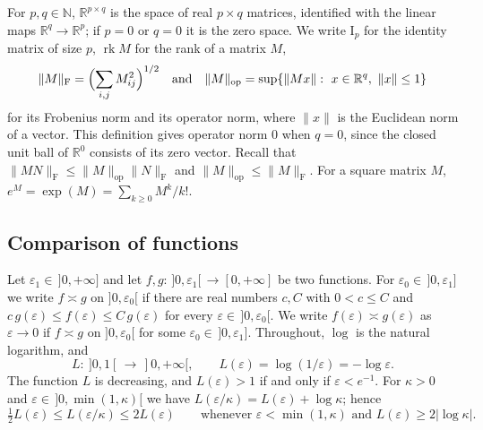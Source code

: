 \documentclass[11pt,a4paper]{article}
\theoremstyle{definition}
\theoremstyle{remark}
\numberwithin{equation}{section}
\newcommand{\N}{\mathbb{N}}
\newcommand{\R}{\mathbb{R}}
\newcommand{\rk}{\operatorname{rk}}
\newcommand{\id}{\mathrm{I}}
\newcommand{\Fr}[1]{\lVert #1\rVert_{\mathrm F}}
\newcommand{\norm}[1]{\lVert #1\rVert}
\newcommand{\abs}[1]{\lvert #1\rvert}
\newcommand{\eps}{\varepsilon}
\begin{document}
For $p,q\in\N$, $\R^{p\times q}$ is the space of real $p\times q$ matrices, identified with the linear maps $\R^q\to\R^p$; if $p=0$ or $q=0$ it is the zero space. We write $\id_p$ for the identity matrix of size $p$, $\rk M$ for the rank of a matrix $M$,
\[
\Fr M=\Bigl(\sum_{i,j}M_{ij}^2\Bigr)^{1/2}\quad\text{and}\quad\norm M_{\mathrm{op}}=\sup\{\norm{Mx}:\ x\in\R^q,\ \norm x\le1\}
\]
for its Frobenius norm and its operator norm, where $\norm x$ is the Euclidean norm of a vector. This definition gives operator norm $0$ when $q=0$, since the closed unit ball of $\R^0$ consists of its zero vector. Recall that $\norm{MN}_{\mathrm F}\le\norm M_{\mathrm{op}}\Fr N$ and $\norm{M}_{\mathrm{op}}\le\Fr M$. For a square matrix $M$, $e^M=\exp(M)=\sum_{k\ge0}M^k/k!$.

\subsection{Comparison of functions}\label{sec:comparison}
Let $\eps_1\in\,]0,+\infty]$ and let $f,g:\,]0,\eps_1[\,\to[0,+\infty]$ be two functions. For $\eps_0\in\,]0,\eps_1]$ we write $f\asymp g$ on $]0,\eps_0[$ if there are real numbers $c,C$ with $0<c\le C$ and $c\,g(\eps)\le f(\eps)\le C\,g(\eps)$ for every $\eps\in\,]0,\eps_0[$. We write $f(\eps)\asymp g(\eps)$ as $\eps\to0$ if $f\asymp g$ on $]0,\eps_0[$ for some $\eps_0\in\,]0,\eps_1]$. Throughout, $\log$ is the natural logarithm, and
\begin{equation}\label{eq:L}
L:\ ]0,1[\,\to\,]0,+\infty[,\qquad L(\eps)=\log(1/\eps)=-\log\eps .
\end{equation}
The function $L$ is decreasing, and $L(\eps)>1$ if and only if $\eps<e^{-1}$. For $\kappa>0$ and $\eps\in\,]0,\min(1,\kappa)[$ we have $L(\eps/\kappa)=L(\eps)+\log\kappa$; hence
\begin{equation}\label{eq:L-shift}
\tfrac12L(\eps)\le L(\eps/\kappa)\le2L(\eps)\qquad\text{whenever }\eps<\min(1,\kappa)\text{ and }L(\eps)\ge2\abs{\log\kappa}.
\end{equation}
\end{document}
